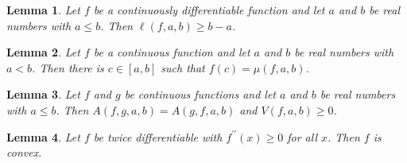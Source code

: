 \documentclass{article}
\newtheorem{lemma}{Lemma}
\begin{document}
\begin{lemma}\label{length}
Let $f$ be a continuously differentiable function and let $a$ and $b$ be real numbers with $a\le b$. Then $\ell(f,a,b)\ge b-a$.
\end{lemma}

\begin{lemma}\label{average}
Let $f$ be a continuous function and let $a$ and $b$ be real numbers with $a<b$. Then there is $c\in[a,b]$ such that $f(c)=\mu(f,a,b)$.
\end{lemma}

\begin{lemma}\label{area}
Let $f$ and $g$ be continuous functions and let $a$ and $b$ be real numbers with $a\le b$. Then $A(f,g,a,b)=A(g,f,a,b)$ and $V(f,a,b)\ge0$.
\end{lemma}

\begin{lemma}\label{words-without-noun}
Let $f$ be twice differentiable with $f^{\prime\prime}(x)\ge0$ for all $x$. Then $f$ is convex.
\end{lemma}
\end{document}
